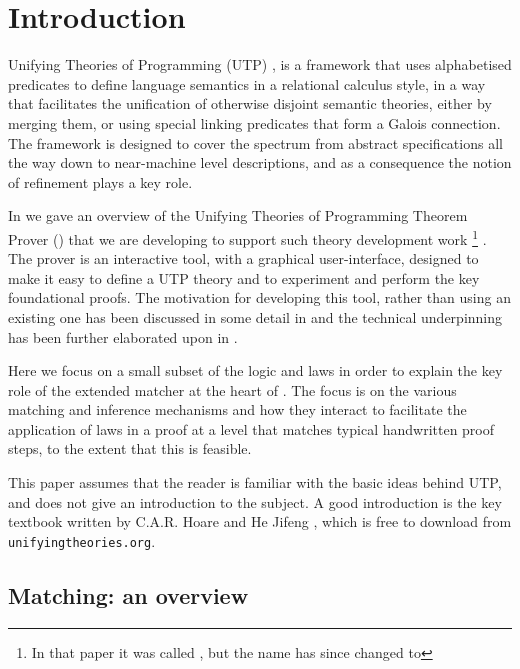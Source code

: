 \section{Introduction}\label{sec:intro}

Unifying Theories of Programming (UTP) \cite{UTP-book},
is a framework that uses alphabetised predicates to define language
semantics in a relational calculus style, in a way that facilitates
the unification of otherwise disjoint semantic theories,
either by merging them, or using special linking predicates
that form a Galois connection. The framework is designed
to cover the spectrum from abstract specifications
all the way down to near-machine level descriptions,
and as a consequence the notion of refinement plays a key role.

In \cite{conf/utp/Butterfield10}
we gave an overview of the Unifying Theories of Programming Theorem Prover
()
that we are developing to support such theory development work%
\footnote{%
In that paper it was called \STHN, but the name has since changed to 
}%
.
The prover is an interactive tool, with a graphical user-interface,
designed to make it easy to define a UTP theory and to experiment
and perform the key foundational proofs.
The motivation for developing this tool,
rather than using an existing one has been discussed in some detail
in \cite{conf/utp/Butterfield10} and the  technical underpinning has been further elaborated upon in \cite{conf/utp/Butterfield12}.

Here we focus on a small subset of the logic and laws
in order to explain the key role of the extended matcher at the heart of .
The focus is on the various matching and inference mechanisms and how they
interact to facilitate the application of laws in a proof at a level
that matches typical handwritten proof steps,
to the extent that this is feasible.

This paper assumes that the reader is familiar
with the basic ideas behind UTP, and does not give an introduction
to the subject. A good introduction is the key textbook written
by C.A.R. Hoare and He Jifeng \cite{UTP-book},
which is free to download from \texttt{unifyingtheories.org}.


\subsection{Matching: an overview}

